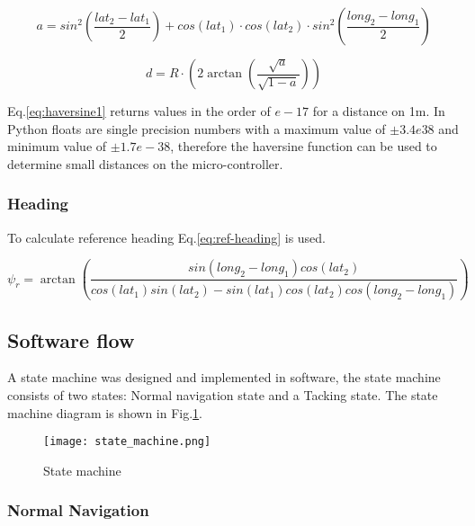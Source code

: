 \begin{equation}
    \label{eq:haversine1}
    a = sin^{2}\left( \frac{lat_{2} - lat_{1}}{2}\right) + cos(lat_{1})\cdot cos(lat_{2})\cdot sin^2\left(\frac{long_{2} - long_{1}}{2}\right)
\end{equation}

\begin{equation}
    \label{eq:haversine2}
    d = R\cdot \left(2\arctan\left(\frac{\sqrt{a}}{\sqrt{1-a}}\right)\right)
\end{equation}


Eq.\ref{eq:haversine1} returns values in the order of $e-17$ for a 
distance on 1m. In Python floats are single precision numbers with a maximum value of $\pm3.4e38$ and minimum value of $\pm1.7e-38$, therefore the haversine function can be used to determine 
small distances on the micro-controller. 

\subsubsection{Heading}
To calculate reference heading Eq.\ref{eq:ref-heading} is used.

\begin{equation}
    \label{eq:ref-heading}
    \psi_{r} = \arctan\left( \frac{sin(long_2 - long_1)cos(lat_2)}{cos(lat_1)sin(lat_2) - sin(lat_1)cos(lat_2)cos(long_2 - long_1)}\right)
\end{equation}


\subsection{Software flow}

A state machine was designed and implemented in software, the state machine consists of two states: Normal navigation state and a Tacking state. The state machine diagram is shown in 
Fig.\ref{fig:state-machine}.


\begin{figure}[!h]
    \centering
    \texttt{[image: state\_machine.png]}
    \caption[State machine]{State machine}
    \label{fig:state-machine}
\end{figure}

\subsubsection{Normal Navigation}

